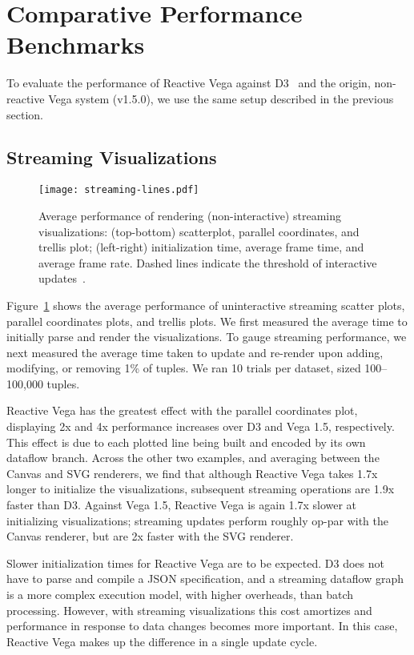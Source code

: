 \section{Comparative Performance Benchmarks}
\label{sec:vg:performance}

To evaluate the performance of Reactive Vega against D3~\cite{bostock:d3} and
the origin, non-reactive Vega system (v1.5.0), we use the same setup described
in the previous section.

\subsection{Streaming Visualizations}

\begin{figure}[h!]
  \centering
  \texttt{[image: streaming-lines.pdf]}
  \caption{Average performance of rendering (non-interactive) streaming visualizations:
(top-bottom) scatterplot, parallel coordinates, and trellis plot; (left-right)
initialization time, average frame time, and average frame rate. Dashed lines
indicate the threshold of interactive updates~\cite{card:modelhuman}.}
  \label{fig:vg:static_benchmark}
\end{figure}

Figure~\ref{fig:vg:static_benchmark} shows the average performance of
uninteractive streaming scatter plots, parallel coordinates plots, and trellis
plots. We first measured the average time to initially parse and render the
visualizations. To gauge streaming performance, we next measured the average
time taken to update and re-render upon adding, modifying, or removing 1\% of
tuples. We ran 10 trials per dataset, sized 100--100,000 tuples.

Reactive Vega has the greatest effect with the parallel coordinates plot,
displaying 2x and 4x performance increases over D3 and Vega 1.5, respectively.
This effect is due to each plotted line being built and encoded by its own
dataflow branch. Across the other two examples, and averaging between the Canvas
and SVG renderers, we find that although Reactive Vega takes 1.7x longer to
initialize the visualizations, subsequent streaming operations are 1.9x faster
than D3. Against Vega 1.5, Reactive Vega is again 1.7x slower at initializing
visualizations; streaming updates perform roughly op-par with the Canvas
renderer, but are 2x faster with the SVG renderer.

Slower initialization times for Reactive Vega are to be expected. D3 does not
have to parse and compile a JSON specification, and a streaming dataflow graph
is a more complex execution model, with higher overheads, than batch processing.
However, with streaming visualizations this cost amortizes and performance in
response to data changes becomes more important. In this case, Reactive Vega
makes up the difference in a single update cycle.

